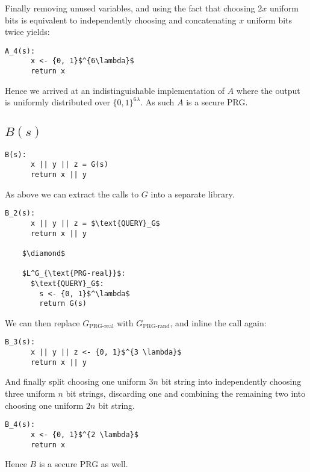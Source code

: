 \documentclass[a4paper]{scrreprt}
\begin{document}
Finally removing unused variables, and using the fact that choosing $2 x$
uniform bits is equivalent to independently choosing and concatenating $x$
uniform bits twice yields:

\begin{lstlisting}[mathescape=true, frame=single]
	A_4(s):
	  x <- {0, 1}$^{6\lambda}$
	  return x
\end{lstlisting}

Hence we arrived at an indistinguishable implementation of $A$ where the output
is uniformly distributed over $\{0, 1\}^{6 \lambda}$. As such $A$ is a secure
PRG.

\subsection{$B(s)$}

\begin{lstlisting}[mathescape=true, frame=single]
	B(s):
	  x || y || z = G(s)
	  return x || y
\end{lstlisting}

As above we can extract the calls to $G$ into a separate library.

\begin{lstlisting}[mathescape=true, frame=single]
	B_2(s):
	  x || y || z = $\text{QUERY}_G$
	  return x || y

	$\diamond$

	$L^G_{\text{PRG-real}}$:
	  $\text{QUERY}_G$:
	    s <- {0, 1}$^\lambda$
	    return G(s)
\end{lstlisting}

We can then replace $G_{\text{PRG-real}}$ with $G_{\text{PRG-rand}}$, and
inline the call again:

\begin{lstlisting}[mathescape=true, frame=single]
	B_3(s):
	  x || y || z <- {0, 1}$^{3 \lambda}$
	  return x || y
\end{lstlisting}

And finally split choosing one uniform $3n$ bit string into independently
choosing three uniform $n$ bit strings, discarding one and combining the
remaining two into choosing one uniform $2n$ bit string.

\begin{lstlisting}[mathescape=true, frame=single]
	B_4(s):
	  x <- {0, 1}$^{2 \lambda}$
	  return x
\end{lstlisting}

Hence $B$ is a secure PRG as well.
\end{document}
